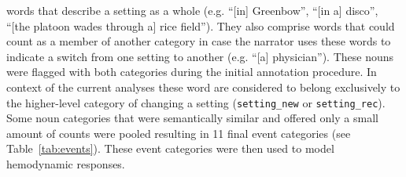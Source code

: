 \documentclass[english,11pt]{article}
\begin{document}
words that describe a setting as a whole (e.g. ``[in] Greenbow'', ``[in a]
disco'', ``[the platoon wades through a] rice field''). They also comprise words
that could count as a member of another category in case the narrator uses these
words to indicate a switch from one setting to another (e.g. ``[a] physician'').
These nouns were flagged with both categories during the initial annotation
procedure. In context of the current analyses these word are considered to
belong exclusively to the higher-level category of changing a setting
(\texttt{setting\_new} or \texttt{setting\_rec}).
Some noun categories that were semantically similar and offered only a small
amount of counts were pooled resulting in 11 final event categories
(see Table~\ref{tab:events}).  These event categories were then used to model
hemodynamic responses.
\end{document}
